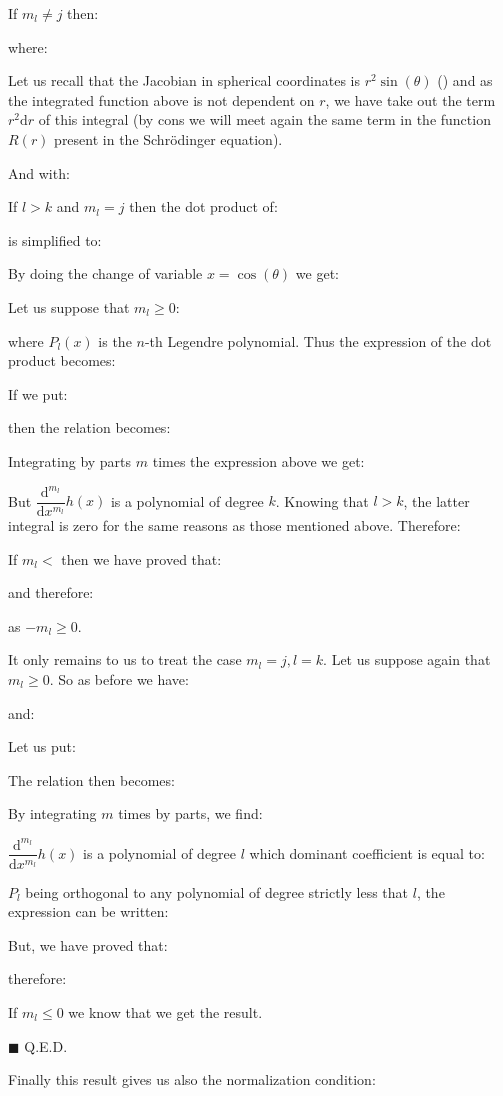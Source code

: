 	\begin{dem}
	If $m_l\neq j$ then:
	
	where:
	
	\begin{tcolorbox}[title=Remark,colframe=black,arc=10pt]
	Let us recall that the Jacobian in spherical coordinates is $r^2\sin(\theta)$ () and as the integrated function above is not dependent on $r$, we have take out the term $r^2\mathrm{d}r$ of this integral (by cons we will meet again the same term in the function $R(r)$ present in the Schrödinger equation).
	\end{tcolorbox}
	And with:
	
	If $l>k$ and $m_l=j$ then the dot product of:
	
	is simplified to:
	
	By doing the change of variable $x=\cos(\theta)$ we get:
	
	Let us suppose that $m_l\geq 0$:
	
	where $P_l(x)$ is the $n$-th Legendre polynomial. Thus the expression of the dot product becomes:
	
	If we put:
	
	then the relation becomes:
	
	Integrating by parts $m$ times the expression above we get:
	
	But $\dfrac{\mathrm{d}^{m_l}}{\mathrm{d}x^{m_l}}h(x)$ is a polynomial of degree $k$. Knowing that $l>k$, the latter integral is zero for the same reasons as those mentioned above. Therefore:
	
	If $m_l<$ then we have proved that:
	
	and therefore:
	
	as $-m_l\geq 0$.
	
	It only remains to us to treat the case $m_l=j,l=k$. Let us suppose again that $m_l\geq 0$. So as before we have:
	
	and:
	
	Let us put:
	
	The relation then becomes:
	
	By integrating $m$ times by parts, we find:
	
	$\dfrac{\mathrm{d} ^{m_l}}{\mathrm{d} x^{m_l}}h(x)$ is a polynomial of degree $l$ which dominant coefficient is equal to:
	
	$P_l$ being orthogonal to any polynomial of degree strictly less that $l$, the expression can be written:
	
	But, we have proved that:
	
	therefore:
	
	If $m_l\leq 0$ we know that we get the result.
	\begin{flushright}
		$\blacksquare$  Q.E.D.
	\end{flushright}
	\end{dem}
	Finally this result gives us also the normalization condition:
	
